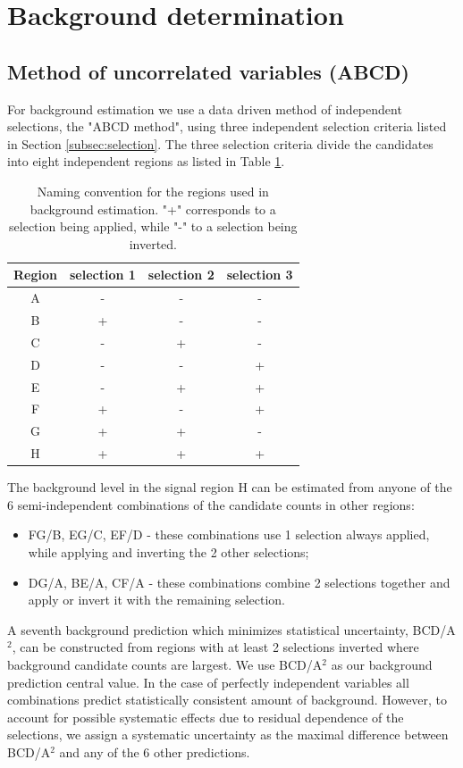 \section{Background determination}
\label{sec:background}

\subsection{Method of uncorrelated variables (ABCD)}
\label{subsec:abcd}
For background estimation we use a data driven method of independent selections, the "ABCD method", using
 three independent selection criteria listed in Section \ref{subsec:selection}. 
The three selection criteria divide the candidates into eight
independent regions as listed in Table \ref{tab:regions}.

\begin{table}[htbp]
\centering
\caption{Naming convention for the regions used in background estimation. "+" corresponds to a selection 
being applied, while "-" to a selection being inverted. \label{tab:regions}}
\begin{tabular}{cccc}
 \hline
  Region & selection 1 & selection 2 & selection 3 \\
 \hline
 A & - & - & - \\
 B & + & - & - \\
 C & - & + & - \\
 D & - & - & + \\
 E & - & + & + \\
 F & + & - & + \\
 G & + & + & - \\
 H & + & + & + \\
\hline
\end{tabular} 
\end{table}

The background level in the signal region H can be estimated from anyone of the 6 semi-independent combinations
of the candidate counts in other regions:
\begin{itemize}
\item FG/B, EG/C, EF/D - these combinations use 1 selection always applied, while applying and inverting the 
2 other selections;
\item DG/A, BE/A, CF/A - these combinations combine 2 selections together and apply or invert it with the 
remaining selection.
\end{itemize}

A seventh background prediction which minimizes statistical uncertainty, BCD/A$^2$, can be constructed from regions
with at least 2 selections inverted where background candidate counts are largest. 
We use BCD/A$^2$ as our background prediction central value. In the case of perfectly independent 
variables all combinations predict statistically consistent  amount of background. 
However, to account for possible systematic
effects due to residual dependence of the selections, we assign a systematic uncertainty as the maximal difference 
between BCD/A$^2$ and any of the 6 other predictions.

